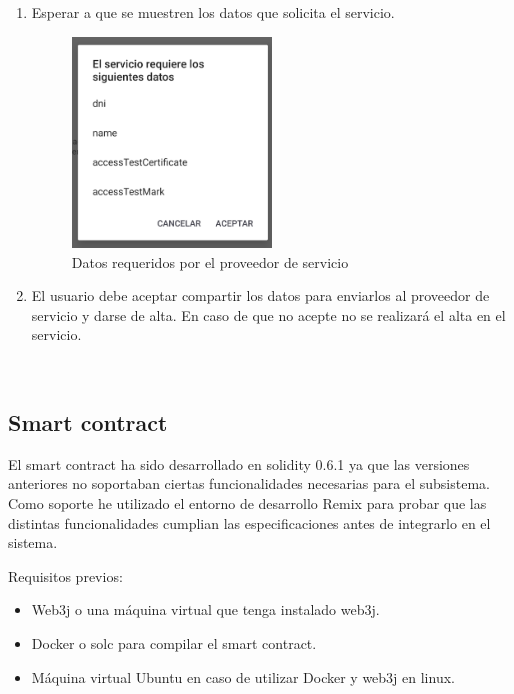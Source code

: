 \documentclass[12pt]{report}
\begin{document}
\begin{enumerate}
\item Esperar a que se muestren los datos que solicita el servicio.
\begin{figure}[H]
\includegraphics[width=0.5\textwidth]{data-required}
\caption{Datos requeridos por el proveedor de servicio}
\end{figure}

\item El usuario debe aceptar compartir los datos para enviarlos al proveedor de servicio y darse de alta. En caso de que no acepte no se realizará el alta en el servicio.
\end{enumerate}

\
\subsection{Smart contract}
El smart contract ha sido desarrollado en solidity 0.6.1 ya que las versiones anteriores no soportaban ciertas funcionalidades necesarias para el subsistema. Como soporte he utilizado el entorno de desarrollo Remix para probar que las distintas funcionalidades cumplian las especificaciones antes de integrarlo en el sistema.

\begin{description}
\item Requisitos previos:
	\begin{itemize}
	\item Web3j o una máquina virtual que tenga instalado web3j.
	\item Docker o solc para compilar el smart contract.
	\item Máquina virtual Ubuntu en caso de utilizar Docker y web3j en linux.
	\end{itemize}
\end{description}
\end{document}
